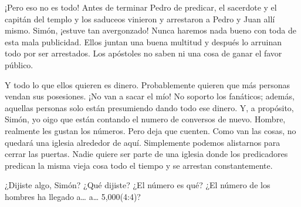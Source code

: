 \documentclass[12pt, twoside, openright]{book}
\begin{document}
¡Pero eso no es todo! Antes de terminar Pedro de predicar, el sacerdote y el capitán del templo y los saduceos vinieron y arrestaron a Pedro y Juan allí mismo. Simón, ¡estuve tan avergonzado! Nunca haremos nada bueno con toda de esta mala publicidad. Ellos juntan una buena multitud y después lo arruinan todo por ser arrestados. Los apóstoles no saben ni una cosa de ganar el favor público.

Y todo lo que ellos quieren es dinero. Probablemente quieren que más personas vendan sus posesiones. ¡No van a sacar el mío! No soporto los fanáticos; además, aquellas personas solo están presumiendo dando todo ese dinero. Y, a propósito, Simón, yo oigo que están contando el numero de conversos de nuevo. Hombre, realmente les gustan los números. Pero deja que cuenten. Como van las cosas, no quedará una iglesia alrededor de aquí. Simplemente podemos alistarnos para cerrar las puertas. Nadie quiere ser parte de una iglesia donde los predicadores predican la misma vieja cosa todo el tiempo y se arrestan constantemente. 

¿Dijiste algo, Simón? ¿Qué dijiste? ¿El número es qué? ¿El número de los hombres ha llegado a… a… 5,000(4:4)?
\end{document}
